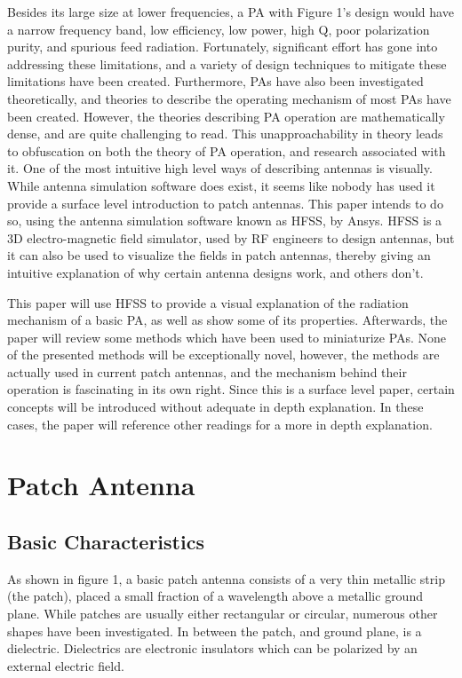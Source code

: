 \documentclass[12pt]{article}
\begin{document}
Besides its large size at lower frequencies, a PA with Figure 1's design would have a narrow frequency band, low efficiency, low power, high Q, poor polarization purity, and spurious feed radiation\cite{balanis2016antenna}. Fortunately, significant effort has gone into addressing these limitations, and a variety of design techniques to mitigate these limitations have been created\cite{balanis2016antenna}. Furthermore, PAs have also been investigated theoretically, and theories to describe the operating mechanism of most PAs have been created. However, the theories describing PA operation are mathematically dense, and are quite challenging to read. This unapproachability in theory leads to obfuscation on both the theory of PA operation, and research associated with it. One of the most intuitive high level ways of describing antennas is visually. While antenna simulation software does exist, it seems like nobody has used it provide a surface level introduction to patch antennas. This paper intends to do so, using the antenna simulation software known as HFSS, by Ansys. HFSS is a 3D electro-magnetic field simulator, used by RF engineers to design antennas, but it can also be used to visualize the fields in patch antennas, thereby giving an intuitive explanation of why certain antenna designs work, and others don't.

This paper will use HFSS to provide a visual explanation of the radiation mechanism of a basic PA, as well as show some of its properties. Afterwards, the paper will review some methods which have been used to miniaturize PAs. None of the presented methods will be exceptionally novel, however, the methods are actually used in current patch antennas, and the mechanism behind their operation is fascinating in its own right. Since this is a surface level paper, certain concepts will be introduced without adequate in depth explanation. In these cases, the paper will reference other readings for a more in depth explanation.            
  
\section{Patch Antenna}

\subsection{Basic Characteristics}
As shown in figure 1, a basic patch antenna consists of a very thin metallic strip (the patch), placed a small fraction of a wavelength above a metallic ground plane. While patches are usually either rectangular or circular\cite{khan2015microstrip}, numerous other shapes have been investigated\cite{balanis2016antenna}. In between the patch, and ground plane, is a dielectric. Dielectrics are electronic insulators which can be polarized by an external electric field. 
\end{document}
